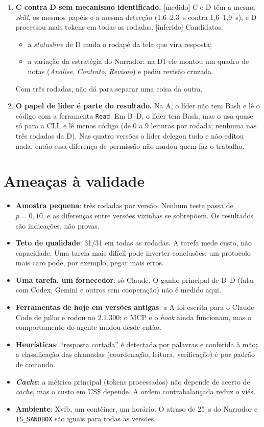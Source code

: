 \documentclass[11pt,a4paper]{article}
\newcommand{\rot}[1]{\textsf{\footnotesize[#1]}}
\begin{document}
\begin{enumerate}[leftmargin=*]
\item \textbf{C contra D sem mecanismo identificado.} \rot{medido} C e D têm a mesma \emph{skill}, os mesmos papéis e
  a mesma detecção (1,6--2,3~s contra 1,6--1,9~s), e D processou mais tokens em todas as rodadas.
  \rot{inferido} Candidatos:
  \begin{itemize}
  \item a \emph{statusline} de D muda o rodapé da tela que vira resposta;
  \item a variação da estratégia do Narrador: na D1 ele montou um quadro de notas
    (\emph{Analise}, \emph{Contrato}, \emph{Revisao}) e pediu revisão cruzada.
  \end{itemize}
  Com três rodadas, não dá para separar uma coisa da outra.

\item \textbf{O papel de líder é parte do resultado.} Na A, o líder não tem Bash e lê o código com a ferramenta
  \texttt{Read}. Em B--D, o líder tem Bash, mas o usa quase só para a CLI, e lê
  menos código (de 0 a 9 leituras por rodada; nenhuma nas três rodadas da D). Nas quatro versões o líder
  delegou tudo e não editou nada, então essa diferença de permissão não mudou quem faz o trabalho.
\end{enumerate}

\section{Ameaças à validade}

\begin{itemize}
\item \textbf{Amostra pequena}: três rodadas por versão. Nenhum teste passa de $p=0{,}10$, e as diferenças entre
  versões vizinhas se sobrepõem. Os resultados são indicações, não provas.
\item \textbf{Teto de qualidade}: 31/31 em todas as rodadas. A tarefa mede custo, não capacidade. Uma tarefa
  mais difícil pode inverter conclusões; um protocolo mais caro pode, por exemplo, pegar mais erros.
\item \textbf{Uma tarefa, um fornecedor}: só Claude. O ganho principal de B--D (falar com Codex, Gemini e outros
  sem cooperação) não é medido aqui.
\item \textbf{Ferramentas de hoje em versões antigas}: a A foi escrita para o Claude Code de julho e rodou no
  2.1.300; o MCP e o \emph{hook} ainda funcionam, mas o comportamento do agente mudou desde então.
\item \textbf{Heurísticas}: ``resposta cortada'' é detectada por palavras e conferida à mão; a classificação das
  chamadas (coordenação, leitura, verificação) é por padrão de comando.
\item \textbf{\emph{Cache}}: a métrica principal (tokens processados) não depende de acerto de \emph{cache}, mas o
  custo em US\$ depende. A ordem contrabalançada reduz o viés.
\item \textbf{Ambiente}: Xvfb, um contêiner, um horário. O atraso de 25~s do Narrador e \texttt{IS\_SANDBOX} são iguais
  para todas as versões.
\end{itemize}
\end{document}
